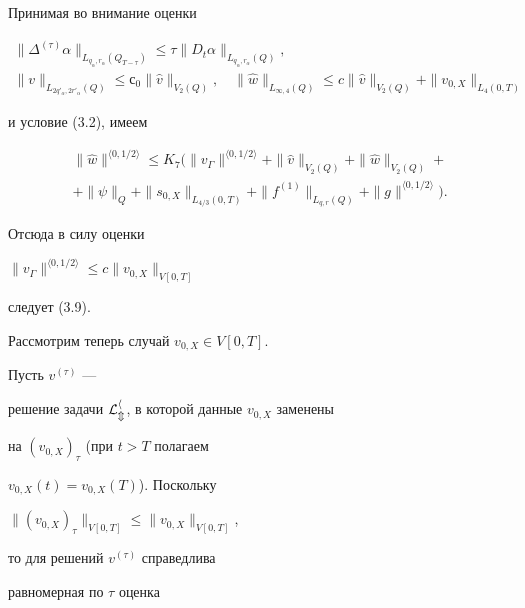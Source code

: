 Принимая во внимание оценки


\begin{gather*}


\|\varDelta^{(\tau)}\alpha\|_{L_{q_\alpha,r_\alpha}(Q_{T-\tau})}


\le \tau\|D_t\alpha\|_{L_{q_\alpha,r_\alpha}(Q)},\\


\|v\|_{L_{2q'_\alpha,2r'_\alpha}(Q)}\le с_0\|\widehat v\|_{V_2(Q)},\quad


\|\widehat w\|_{L_{\infty,4}(Q)}\le


c\|\widehat v\|_{V_2(Q)}+\|v_{0,X}\|_{L_4(0,T)}


\end{gather*}


и условие (3.2), имеем


\begin{multline*}


\|\widehat w\|^{\langle 0,1/2\rangle}\le K_7


\big(\|v_\Gamma\|^{\langle 0,1/2\rangle}+


\|\widehat v\|_{V_2(Q)}+\|\widehat w\|_{V_2(Q)}+\\


+\|\psi\|_Q +\|s_{0,X}\|_{L_{4/3}(0,T)}+ \|f^{(1)}\|_{L_{q,r}(Q)}+


\|g\|^{\langle 0,1/2\rangle}\big).


\end{multline*}


Отсюда в силу оценки


$\|v_{\Gamma}\|^{\langle 0,1/2\rangle}


\le c\|v_{0,X}\|_{V[0,T]}$


следует (3.9).








Рассмотрим теперь случай $v_{0,X}\in V[0,T]$.


Пусть $v^{(\tau)}$ ---


решение задачи $\cal L_m^h$, в которой данные $v_{0,X}$ заменены


на $(v_{0,X})_{\tau}$ (при $t>T$ полагаем


$v_{0,X}(t)=v_{0,X}(T)$). Поскольку


$\|(v_{0,X})_\tau\|_{V[0,T]}\le \|v_{0,X}\|_{V[0,T]}$,


то для решений $v^{(\tau)}$ справедлива


равномерная по $\tau$ оценка


